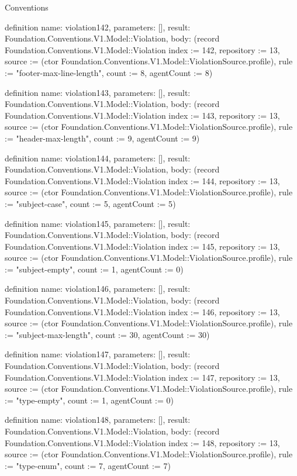 \begin{lexlean}{Conventions}
\begin{semanticmodule}
definition{
  name: violation142,
  parameters: [],
  result: Foundation.Conventions.V1.Model::Violation,
  body: (record Foundation.Conventions.V1.Model::Violation {index := 142, repository := 13, source := (ctor Foundation.Conventions.V1.Model::ViolationSource.profile), rule := "footer-max-line-length", count := 8, agentCount := 8})
}

definition{
  name: violation143,
  parameters: [],
  result: Foundation.Conventions.V1.Model::Violation,
  body: (record Foundation.Conventions.V1.Model::Violation {index := 143, repository := 13, source := (ctor Foundation.Conventions.V1.Model::ViolationSource.profile), rule := "header-max-length", count := 9, agentCount := 9})
}

definition{
  name: violation144,
  parameters: [],
  result: Foundation.Conventions.V1.Model::Violation,
  body: (record Foundation.Conventions.V1.Model::Violation {index := 144, repository := 13, source := (ctor Foundation.Conventions.V1.Model::ViolationSource.profile), rule := "subject-case", count := 5, agentCount := 5})
}

definition{
  name: violation145,
  parameters: [],
  result: Foundation.Conventions.V1.Model::Violation,
  body: (record Foundation.Conventions.V1.Model::Violation {index := 145, repository := 13, source := (ctor Foundation.Conventions.V1.Model::ViolationSource.profile), rule := "subject-empty", count := 1, agentCount := 0})
}

definition{
  name: violation146,
  parameters: [],
  result: Foundation.Conventions.V1.Model::Violation,
  body: (record Foundation.Conventions.V1.Model::Violation {index := 146, repository := 13, source := (ctor Foundation.Conventions.V1.Model::ViolationSource.profile), rule := "subject-max-length", count := 30, agentCount := 30})
}

definition{
  name: violation147,
  parameters: [],
  result: Foundation.Conventions.V1.Model::Violation,
  body: (record Foundation.Conventions.V1.Model::Violation {index := 147, repository := 13, source := (ctor Foundation.Conventions.V1.Model::ViolationSource.profile), rule := "type-empty", count := 1, agentCount := 0})
}

definition{
  name: violation148,
  parameters: [],
  result: Foundation.Conventions.V1.Model::Violation,
  body: (record Foundation.Conventions.V1.Model::Violation {index := 148, repository := 13, source := (ctor Foundation.Conventions.V1.Model::ViolationSource.profile), rule := "type-enum", count := 7, agentCount := 7})
}


\end{semanticmodule}
\end{lexlean}

